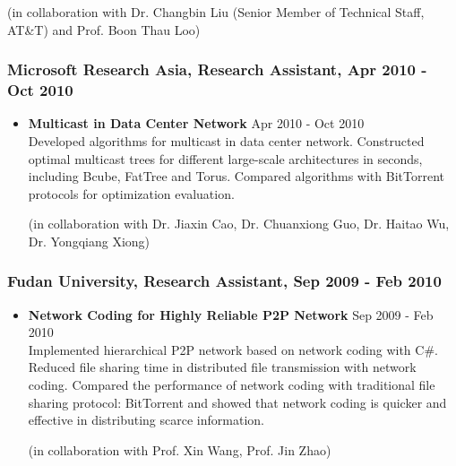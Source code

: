\documentclass[10pt]{res} %
\begin{document}
\begin{resume}
\begin{itemize}
(in collaboration with Dr. Changbin Liu (Senior Member of Technical Staff, AT\&T) and Prof. Boon Thau Loo)
\end{itemize}

\subsubsection{Microsoft Research Asia, Research Assistant, Apr 2010 - Oct 2010}
\begin{itemize}
\item {\bf Multicast in Data Center Network} \hfill Apr 2010 - Oct 2010\\
Developed algorithms for multicast in data center network. Constructed optimal
multicast trees for different large-scale architectures in seconds, including
Bcube, FatTree and Torus. Compared algorithms with BitTorrent protocols for
optimization evaluation.

(in collaboration with Dr. Jiaxin Cao, Dr. Chuanxiong Guo, Dr. Haitao Wu, Dr. Yongqiang Xiong)
\end{itemize}

\subsubsection{Fudan University, Research Assistant, Sep 2009 - Feb 2010}
\begin{itemize}
\item {\bf Network Coding for Highly Reliable P2P Network} \hfill Sep 2009 - Feb 2010\\
Implemented hierarchical P2P network based on network coding with C$\#$. Reduced
file sharing time in distributed file transmission with network coding. Compared
the performance of network coding with traditional file sharing protocol:
BitTorrent and showed that network coding is quicker and effective in
distributing scarce information.

(in collaboration with Prof. Xin Wang, Prof. Jin Zhao)
\end{itemize}





\end{resume}
\end{document}
